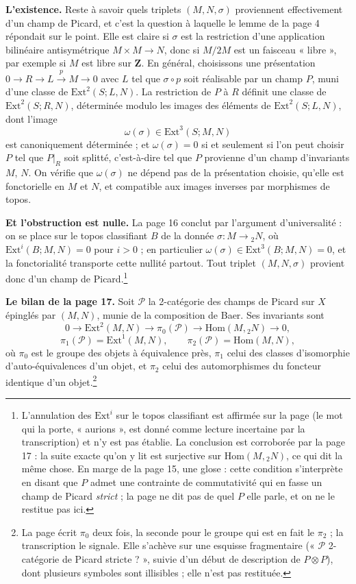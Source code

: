 \documentclass[11pt,a4paper]{article}
\begin{document}
\textbf{L'existence.} Reste à savoir quels triplets $(M,N,\sigma)$ proviennent
effectivement d'un champ de Picard, et c'est la question à laquelle le lemme
de la page 4 répondait sur le point. Elle est claire si $\sigma$ est la
restriction d'une application bilinéaire antisymétrique $M \times M \to N$,
donc si $M/2M$ est un faisceau « libre », par exemple si $M$ est libre sur
$\mathbf{Z}$. En général, choisissons une présentation $0 \to R \to L
\xrightarrow{p} M \to 0$ avec $L$ tel que $\sigma \circ p$ soit réalisable par
un champ $P$, muni d'une classe de $\mathrm{Ext}^{2}(S; L,N)$. La restriction
de $P$ à $R$ définit une classe de $\mathrm{Ext}^{2}(S; R,N)$, déterminée
modulo les images des éléments de $\mathrm{Ext}^{2}(S; L,N)$, dont l'image
\[
\omega(\sigma) \in \mathrm{Ext}^{3}(S; M,N)
\]
est canoniquement déterminée ; et $\omega(\sigma) = 0$ si et seulement si l'on
peut choisir $P$ tel que $P|_{R}$ soit splitté, c'est-à-dire tel que $P$
provienne d'un champ d'invariants $M$, $N$. On vérifie que $\omega(\sigma)$ ne
dépend pas de la présentation choisie, qu'elle est fonctorielle en $M$ et $N$,
et compatible aux images inverses par morphismes de topos.

\textbf{Et l'obstruction est nulle.} La page 16 conclut par l'argument
d'universalité : on se place sur le topos classifiant $B$ de la donnée
$\sigma : M \to {}_{2}N$, où $\mathrm{Ext}^{i}(B; M,N) = 0$ pour $i > 0$ ; en
particulier $\omega(\sigma) \in \mathrm{Ext}^{3}(B;M,N) = 0$, et la
fonctorialité transporte cette nullité partout. Tout triplet $(M,N,\sigma)$
provient donc d'un champ de Picard.\footnote{L'annulation des
$\mathrm{Ext}^{i}$ sur le topos classifiant est affirmée sur la page (le mot qui la porte, « aurions », est donné comme
lecture incertaine par la transcription) et n'y est pas établie. La
conclusion est corroborée
par la page 17 : la suite exacte qu'on y lit est surjective sur
$\mathrm{Hom}(M, {}_{2}N)$, ce qui dit la même chose. En marge de la page 15,
une glose : cette condition s'interprète en disant que $P$ admet une
contrainte de commutativité qui en fasse un champ de Picard \emph{strict} ;
la page ne dit pas de quel $P$ elle parle, et on ne le restitue pas ici.}

\textbf{Le bilan de la page 17.} Soit $\mathcal{P}$ la 2-catégorie des champs
de Picard sur $X$ épinglés par $(M,N)$, munie de la composition de Baer. Ses
invariants sont
\[
0 \longrightarrow \mathrm{Ext}^{2}(M,N) \longrightarrow \pi_{0}(\mathcal{P})
\longrightarrow \mathrm{Hom}(M, {}_{2}N) \longrightarrow 0,
\]
\[
\pi_{1}(\mathcal{P}) = \mathrm{Ext}^{1}(M,N), \qquad
\pi_{2}(\mathcal{P}) = \mathrm{Hom}(M,N),
\]
où $\pi_{0}$ est le groupe des objets à équivalence près, $\pi_{1}$ celui des
classes d'isomorphie d'auto-équivalences d'un objet, et $\pi_{2}$ celui des
automorphismes du foncteur identique d'un objet.\footnote{La page écrit
$\pi_{0}$ deux fois, la seconde pour le groupe qui est en fait le $\pi_{2}$ ;
la transcription le signale. Elle s'achève sur une esquisse fragmentaire
(« $\mathcal{P}$ 2-catégorie de Picard stricte ? », suivie d'un début de
description de $P \otimes P$), dont plusieurs symboles sont illisibles ; elle
n'est pas restituée.}
\end{document}
